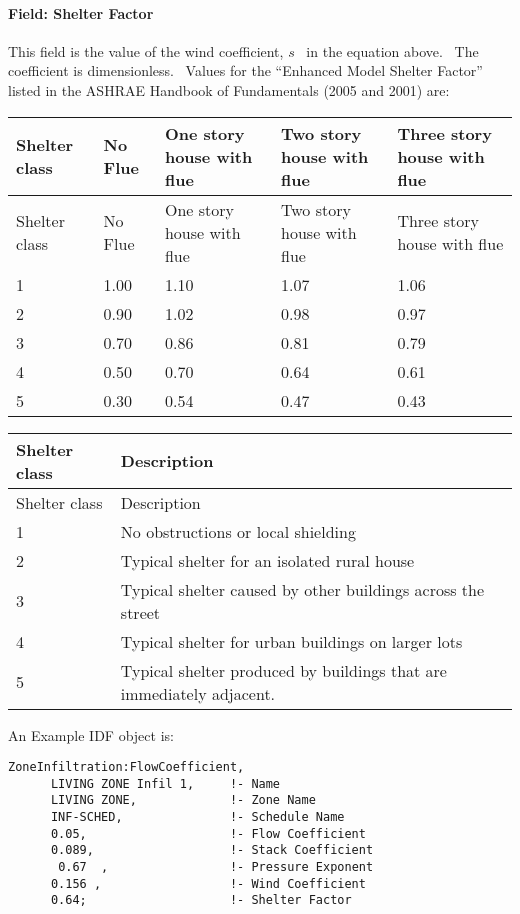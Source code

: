 \paragraph{Field: Shelter Factor}\label{field-shelter-factor}

This field is the value of the wind coefficient, \(s\) ~in the equation above.~ The coefficient is dimensionless.~ Values for the ``Enhanced Model Shelter Factor'' listed in the ASHRAE Handbook of Fundamentals (2005 and 2001) are:

\begin{longtable}[c]{@{}lllll@{}}
\toprule
Shelter class & No Flue & One story house with flue & Two story house with flue & Three story house with flue \tabularnewline
\midrule
\endfirsthead

\toprule
Shelter class & No Flue & One story house with flue & Two story house with flue & Three story house with flue \tabularnewline
\midrule
\endhead

1 & 1.00 & 1.10 & 1.07 & 1.06 \tabularnewline
2 & 0.90 & 1.02 & 0.98 & 0.97 \tabularnewline
3 & 0.70 & 0.86 & 0.81 & 0.79 \tabularnewline
4 & 0.50 & 0.70 & 0.64 & 0.61 \tabularnewline
5 & 0.30 & 0.54 & 0.47 & 0.43 \tabularnewline
\bottomrule
\end{longtable}

\begin{longtable}[c]{p{1.5in}p{4.5in}}
\toprule 
Shelter class & Description \tabularnewline
\midrule
\endfirsthead

\toprule 
Shelter class & Description \tabularnewline
\midrule
\endhead

1 & No obstructions or local shielding \tabularnewline
2 & Typical shelter for an isolated rural house \tabularnewline
3 & Typical shelter caused by other buildings across the street \tabularnewline
4 & Typical shelter for urban buildings on larger lots \tabularnewline
5 & Typical shelter produced by buildings that are immediately adjacent. \tabularnewline
\bottomrule
\end{longtable}

An Example IDF object is:

\begin{lstlisting}
ZoneInfiltration:FlowCoefficient,
      LIVING ZONE Infil 1,     !- Name
      LIVING ZONE,             !- Zone Name
      INF-SCHED,               !- Schedule Name
      0.05,                    !- Flow Coefficient
      0.089,                   !- Stack Coefficient
       0.67  ,                 !- Pressure Exponent
      0.156 ,                  !- Wind Coefficient
      0.64;                    !- Shelter Factor
\end{lstlisting}

